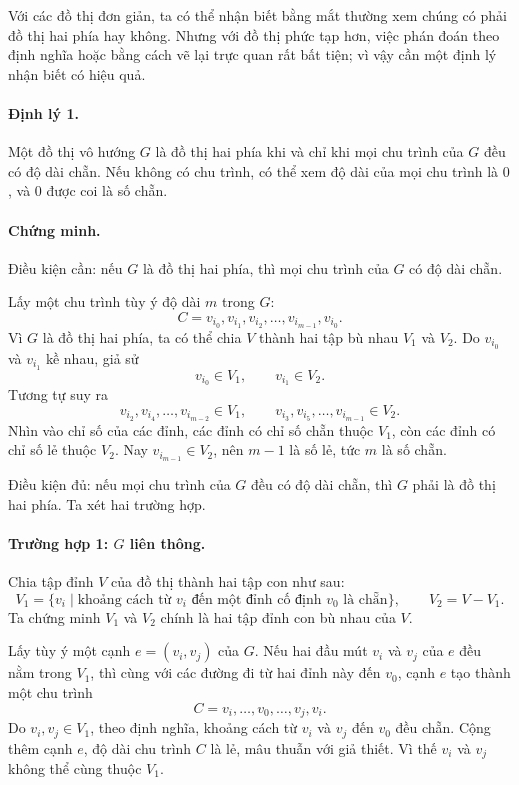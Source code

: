 \documentclass[11pt]{article}
\begin{document}
Với các đồ thị đơn giản, ta có thể nhận biết bằng mắt thường xem chúng có
phải đồ thị hai phía hay không. Nhưng với đồ thị phức tạp hơn, việc phán
đoán theo định nghĩa hoặc bằng cách vẽ lại trực quan rất bất tiện; vì vậy cần
một định lý nhận biết có hiệu quả.

\paragraph{Định lý 1.}
Một đồ thị vô hướng \(G\) là đồ thị hai phía khi và chỉ khi mọi chu trình của
\(G\) đều có độ dài chẵn. Nếu không có chu trình, có thể xem độ dài của mọi
chu trình là \(0\), và \(0\) được coi là số chẵn.

\paragraph{Chứng minh.}
Điều kiện cần: nếu \(G\) là đồ thị hai phía, thì mọi chu trình của \(G\) có
độ dài chẵn.

Lấy một chu trình tùy ý độ dài \(m\) trong \(G\):
\[
  C=v_{i_0},v_{i_1},v_{i_2},\ldots,v_{i_{m-1}},v_{i_0}.
\]
Vì \(G\) là đồ thị hai phía, ta có thể chia \(V\) thành hai tập bù nhau
\(V_1\) và \(V_2\). Do \(v_{i_0}\) và \(v_{i_1}\) kề nhau, giả sử
\[
  v_{i_0}\in V_1,\qquad v_{i_1}\in V_2.
\]
Tương tự suy ra
\[
  v_{i_2},v_{i_4},\ldots,v_{i_{m-2}}\in V_1,\qquad
  v_{i_3},v_{i_5},\ldots,v_{i_{m-1}}\in V_2.
\]
Nhìn vào chỉ số của các đỉnh, các đỉnh có chỉ số chẵn thuộc \(V_1\), còn các
đỉnh có chỉ số lẻ thuộc \(V_2\). Nay \(v_{i_{m-1}}\in V_2\), nên \(m-1\) là
số lẻ, tức \(m\) là số chẵn.

Điều kiện đủ: nếu mọi chu trình của \(G\) đều có độ dài chẵn, thì \(G\) phải
là đồ thị hai phía. Ta xét hai trường hợp.

\paragraph{Trường hợp 1: \(G\) liên thông.}
Chia tập đỉnh \(V\) của đồ thị thành hai tập con như sau:
\[
  V_1=\{v_i\mid \text{khoảng cách từ }v_i\text{ đến một đỉnh cố định }v_0
  \text{ là chẵn}\},\qquad
  V_2=V-V_1.
\]
Ta chứng minh \(V_1\) và \(V_2\) chính là hai tập đỉnh con bù nhau của \(V\).

Lấy tùy ý một cạnh \(e=(v_i,v_j)\) của \(G\). Nếu hai đầu mút \(v_i\) và
\(v_j\) của \(e\) đều nằm trong \(V_1\), thì cùng với các đường đi từ hai
đỉnh này đến \(v_0\), cạnh \(e\) tạo thành một chu trình
\[
  C=v_i,\ldots,v_0,\ldots,v_j,v_i.
\]
Do \(v_i,v_j\in V_1\), theo định nghĩa, khoảng cách từ \(v_i\) và \(v_j\) đến
\(v_0\) đều chẵn. Cộng thêm cạnh \(e\), độ dài chu trình \(C\) là lẻ, mâu
thuẫn với giả thiết. Vì thế \(v_i\) và \(v_j\) không thể cùng thuộc \(V_1\).
\end{document}
